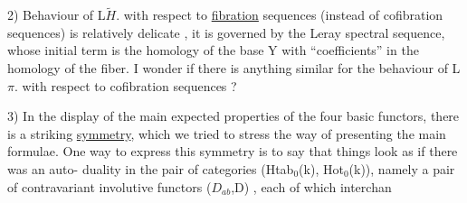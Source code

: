 2) Behaviour of L$\widetilde{H}$. with respect to \uline{fibration} sequences 
(instead of cofibration sequences)  is  relatively delicate , it is
governed by the Leray spectral sequence, whose initial term is the
homology of the base Y with ``coefficients'' in the homology of the 
 fiber. I wonder if there is anything similar for the behaviour
of L$\pi$. with respect to cofibration sequences ?

3) In the display of the main expected properties of the four
basic functors, there is a striking \uline{symmetry}, which we tried to stress
  the way of presenting the main formulae. One way to express
this symmetry is to say that things look  as if there was an auto-%
duality in the pair of categories (Htab$_0$(k), Hot$_0$(k)), namely a pair
of contravariant involutive functors ($D_{ab}$,D) , each of which interchan


